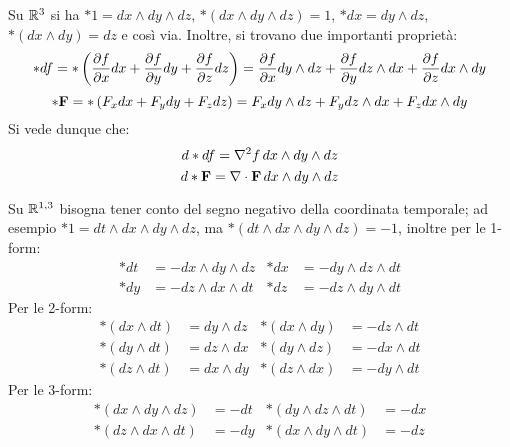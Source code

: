 \begin{example}
	Su $ \mathbb{R}^3 $ si ha $ *1 = dx \wedge dy \wedge dz $, $ * \left( dx \wedge dy \wedge dz \right) = 1 $, $ *dx = dy \wedge dz $, $ * \left( dx \wedge dy \right) = dz $ e così via. Inoltre, si trovano due importanti proprietà:
	\begin{equation*}
		*df = * \left( \frac{\partial f}{\partial x}dx + \frac{\partial f}{\partial y}dy + \frac{\partial f}{\partial z}dz \right) = \frac{\partial f}{\partial x} dy \wedge dz + \frac{\partial f}{\partial y} dz \wedge dx + \frac{\partial f}{\partial z} dx \wedge dy
	\end{equation*}
	\begin{equation*}
		*\mathbf{F} = * \left( F_x dx + F_y dy + F_z dz \right) = F_x dy \wedge dz + F_y dz \wedge dx + F_z dx \wedge dy
	\end{equation*}
	Si vede dunque che:
	\begin{equation}
		d*df = \nabla^2 f \, dx \wedge dy \wedge dz
		\label{eq:3.19}
	\end{equation}
	\begin{equation}
		d*\mathbf{F} = \nabla\cdot\mathbf{F} \, dx \wedge dy \wedge dz
		\label{eq:3.20}
	\end{equation}
\end{example}
\begin{example}
	Su $ \mathbb{R}^{1,3} $ bisogna tener conto del segno negativo della coordinata temporale; ad esempio $ *1 = dt \wedge dx \wedge dy \wedge dz $, ma $ * \left( dt \wedge dx \wedge dy \wedge dz \right) = -1 $, inoltre per le 1-form:
	\begin{align*}
		*dt &= - dx \wedge dy \wedge dz & *dx &= - dy \wedge dz \wedge dt \\
		*dy &= - dz \wedge dx \wedge dt & *dz &= - dz \wedge dy \wedge dt
	\end{align*}
	Per le 2-form:
	\begin{align*}
		*(dx \wedge dt) &= dy \wedge dz & *(dx \wedge dy) &= - dz \wedge dt \\
		*(dy \wedge dt) &= dz \wedge dx & *(dy \wedge dz) &= - dx \wedge dt \\
		*(dz \wedge dt) &= dx \wedge dy & *(dz \wedge dx) &= - dy \wedge dt
	\end{align*}
	Per le 3-form:
	\begin{align*}
		*(dx \wedge dy \wedge dz) &= - dt & *(dy \wedge dz \wedge dt) &= -dx \\
		*(dz \wedge dx \wedge dt) &= - dy & *(dx \wedge dy \wedge dt) &= -dz
	\end{align*}
\end{example}










